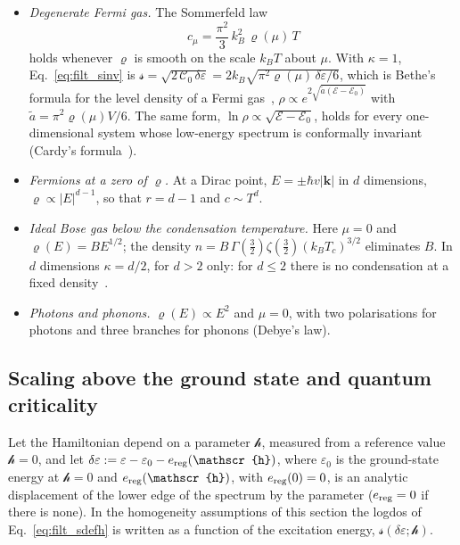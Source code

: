 \documentclass[10pt,a4paper]{article}
\theoremstyle{plain}
\newcommand{\lndos}{{logdos}}  %
\newcommand{\hfield}{\mathscr{h}}  %
\newcommand{\enrg}{\mathcal{E}}  %
\newcommand{\lds}{\mathscr{s}}  %
\begin{document}
\begin{itemize}\setlength{\itemsep}{0pt}
\item \emph{Degenerate Fermi gas.} The Sommerfeld law
  \begin{equation}\label{eq:filt_sommerfeld}
    c_\mu=\frac{\pi^{2}}{3}\,k_B^{2}\,\varrho(\mu)\,T
  \end{equation}
  holds whenever $\varrho$ is smooth on the scale $k_BT$ about $\mu$. With
  $\kappa=1$, Eq.~\eqref{eq:filt_sinv} is
  $\lds = \sqrt{2\,\mathcal C_0\,\delta\varepsilon}
  = 2k_B\sqrt{\pi^{2}\varrho(\mu)\,\delta\varepsilon/6}$,
  which is Bethe's formula for the level density of a Fermi
  gas~\cite{Bethe1936}, $ \rho \propto e^{2\sqrt{\tilde a(\enrg-\enrg_0)}} $
  with $ \tilde a = \pi^{2}\varrho(\mu)V/6 $.
  The same form, $\ln\rho\propto\sqrt{\enrg-\enrg_0}$, holds for
  every one-dimensional system whose low-energy spectrum is conformally
  invariant (Cardy's formula~\cite{Cardy1986}).
\item \emph{Fermions at a zero of $ \varrho $.} At a Dirac point,
  $E=\pm\hbar v|\mathbf k|$ in $d$ dimensions, $\varrho\propto|E|^{d-1}$, so
  that $r=d-1$ and $c\sim T^{d}$.
\item \emph{Ideal Bose gas below the condensation temperature.} Here
  $ \mu=0 $ and $ \varrho(E)=BE^{1/2} $; the density
  $n=B\,\Gamma(\tfrac32)\zeta(\tfrac32)(k_BT_c)^{3/2}$ eliminates $B$. In $d$
  dimensions $\kappa=d/2$, for $d>2$ only: for $d\le2$ there is no
  condensation at a fixed density~\cite[Sec.~6.4]{Honerkamp}.
\item \emph{Photons and phonons.} $\varrho(E)\propto E^{2}$ and $\mu=0$,
  with two polarisations for photons and three branches for phonons
  (Debye's law).
\end{itemize}

\subsection{Scaling above the ground state and quantum criticality}
\label{sec:filt_scaling0}

Let the Hamiltonian depend on a parameter $ \hfield $, measured from a
reference value $\hfield=0$, and let
$\delta\varepsilon:=\varepsilon-\varepsilon_0-e_{\rm reg}(\hfield)$, where
$\varepsilon_0$ is the ground-state energy at $\hfield=0$ and
$e_{\rm reg}(\hfield)$, with $e_{\rm reg}(0)=0$, is an analytic displacement
of the lower edge of the spectrum by the parameter ($e_{\rm reg}=0$ if
there is none). In the homogeneity assumptions of this section the
\lndos{} of Eq.~\eqref{eq:filt_sdefh} is written as a function of the
excitation energy, $\lds(\delta\varepsilon;\hfield)$.
\end{document}

